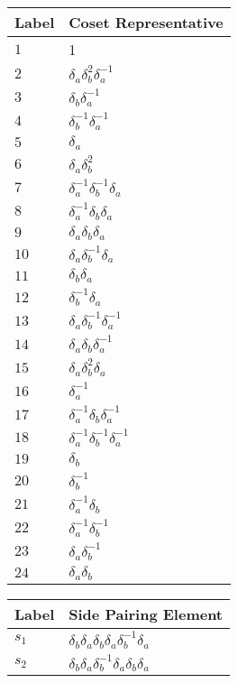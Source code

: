 \documentclass{article}
\begin{document}

\begin{center}
\begin{tabular}{ll}
\toprule
Label & Coset Representative\\
\midrule
$1$ & 1 \\
$2$ & $\delta_a^{}\delta_b^{2}\delta_a^{-1}$ \\
$3$ & $\delta_b^{}\delta_a^{-1}$ \\
$4$ & $\delta_b^{-1}\delta_a^{-1}$ \\
$5$ & $\delta_a^{}$ \\
$6$ & $\delta_a^{}\delta_b^{2}$ \\
$7$ & $\delta_a^{-1}\delta_b^{-1}\delta_a^{}$ \\
$8$ & $\delta_a^{-1}\delta_b^{}\delta_a^{}$ \\
$9$ & $\delta_a^{}\delta_b^{}\delta_a^{}$ \\
$10$ & $\delta_a^{}\delta_b^{-1}\delta_a^{}$ \\
$11$ & $\delta_b^{}\delta_a^{}$ \\
$12$ & $\delta_b^{-1}\delta_a^{}$ \\
$13$ & $\delta_a^{}\delta_b^{-1}\delta_a^{-1}$ \\
$14$ & $\delta_a^{}\delta_b^{}\delta_a^{-1}$ \\
$15$ & $\delta_a^{}\delta_b^{2}\delta_a^{}$ \\
$16$ & $\delta_a^{-1}$ \\
$17$ & $\delta_a^{-1}\delta_b^{}\delta_a^{-1}$ \\
$18$ & $\delta_a^{-1}\delta_b^{-1}\delta_a^{-1}$ \\
$19$ & $\delta_b^{}$ \\
$20$ & $\delta_b^{-1}$ \\
$21$ & $\delta_a^{-1}\delta_b^{}$ \\
$22$ & $\delta_a^{-1}\delta_b^{-1}$ \\
$23$ & $\delta_a^{}\delta_b^{-1}$ \\
$24$ & $\delta_a^{}\delta_b^{}$ \\
\bottomrule
\end{tabular}
\hfill
\begin{tabular}{ll}
\toprule
Label & Side Pairing Element\\
\midrule
$s_{1}$ & $\delta_b^{}\delta_a^{}\delta_b^{}\delta_a^{}\delta_b^{-1}\delta_a^{}\
$ \\
$s_{2}$ & $\delta_b^{}\delta_a^{}\delta_b^{-1}\delta_a^{}\delta_b^{}\delta_a^{}\
$ \\

\end{tabular}
\end{center}
\end{document}
